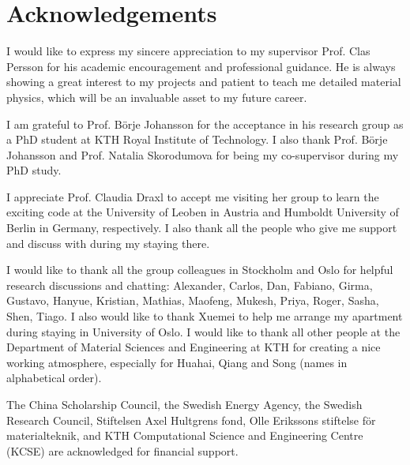 \documentclass[a4paper, 12pt, titlepage,oneside,drop]{kthesis}
\newcommand\blankpage{%
    \null
    \thispagestyle{empty}%
    \addtocounter{page}{-1}%
    \newpage}
\begin{document}
\newpage
\blankpage


\setcounter{page}{49}


\chapter*{Acknowledgements} 

I would like to express my sincere appreciation to my supervisor Prof. Clas Persson for his academic encouragement and professional guidance. He is always showing a great interest to my projects and patient to teach me detailed
material physics, which will be an invaluable asset to my future career.

I am grateful to Prof. Börje Johansson for the acceptance in his research group as a PhD student at KTH Royal Institute of Technology. I also thank Prof. Börje Johansson and Prof. Natalia Skorodumova for being my co-supervisor during my PhD study.

I appreciate Prof. Claudia Draxl to accept me visiting her group to learn the exciting code at the University of Leoben in Austria and Humboldt University of Berlin in Germany, respectively. I also thank all the people who give me support and
discuss with during my staying there.

I would like to thank all the group colleagues in Stockholm and Oslo for helpful research discussions and chatting: Alexander, Carlos, Dan, Fabiano, Girma, Gustavo, Hanyue, Kristian, Mathias, Maofeng, Mukesh, Priya, Roger, Sasha, Shen, Tiago.
I also would like to thank Xuemei to help me arrange my apartment during staying in University of Oslo. I would like to thank all other people at the Department of Material Sciences and Engineering at KTH for creating a nice working atmosphere,
especially for Huahai, Qiang and Song (names in alphabetical order).

The China Scholarship Council, the Swedish Energy Agency, the Swedish Research Council, Stiftelsen Axel Hultgrens fond,  Olle Erikssons stiftelse för materialteknik, and KTH Computational Science and Engineering Centre (KCSE) 
are acknowledged for financial support.


\newpage
\blankpage


\setcounter{page}{51}






\newpage
\blankpage


\setcounter{page}{59}
\end{document}
